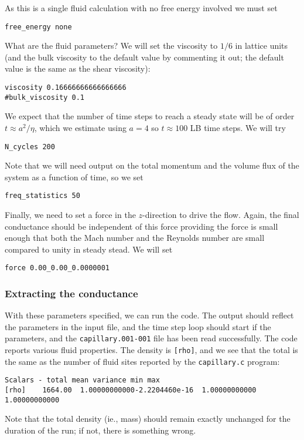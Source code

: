 As this is a single fluid calculation with no free energy involved
we must set
\begin{lstlisting}
free_energy none
\end{lstlisting}
What are the fluid parameters? We will set the viscosity to
$1/6$ in lattice units (and the bulk viscosity to the default
value by commenting it out; the default value is the same as
the shear viscosity):
\begin{lstlisting}
viscosity 0.16666666666666666
#bulk_viscosity 0.1
\end{lstlisting}
We expect that the number of time steps to reach a steady state
will be of order $t \approx a^2/\eta$, which we estimate using
$a=4$ so $t \approx 100$ LB time steps. We will try
\begin{lstlisting}
N_cycles 200
\end{lstlisting}
Note that we will need output on the total momentum and the volume
flux of the system
as a function of time, so we set
\begin{lstlisting}
freq_statistics 50
\end{lstlisting}

Finally, we need to set a force in the $z$-direction to drive the
flow. Again, the final conductance should be independent of this
force providing the force is small enough that both the Mach number
and the Reynolds number are small compared to unity in steady stead.
We will set
\begin{lstlisting}
force 0.00_0.00_0.0000001
\end{lstlisting}

\subsubsection{Extracting the conductance}

With these parameters specified, we can run the code. The output
should reflect the parameters in the input file, and the time step
loop should start if the parameters, and the \texttt{capillary.001-001}
file has been read successfully. The code reports various fluid
properties. The density is \texttt{[rho]}, and we see that the
total is the same as the number of fluid sites reported by the
\texttt{capillary.c} program:
\begin{lstlisting}
Scalars - total mean variance min max
[rho]    1664.00  1.00000000000-2.2204460e-16  1.00000000000 1.00000000000
\end{lstlisting}
Note that the total density (ie., mass) should remain exactly unchanged
for the duration of the run; if not, there is something wrong.

